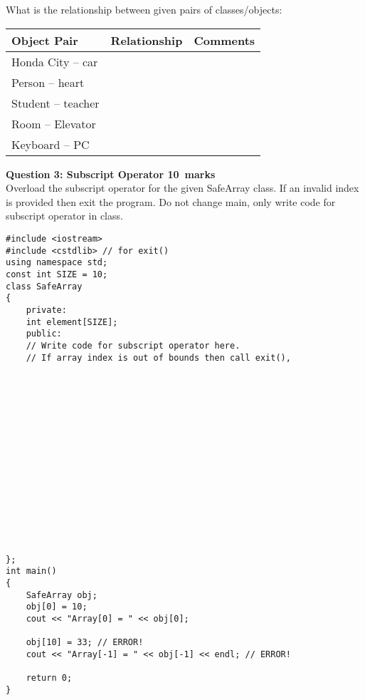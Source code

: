 \documentclass[12pt,a4paper]{article}
\def\Qthree{10}
\begin{document}
What is the relationship between given pairs of classes/objects:
\begin{table}[H]
\begin{center}
\vspace{0.3cm}
	{\normalsize \begin{tabular}{|l|c|p{8cm}|}
	\hline \hline
		\rule{0pt}{2.6ex} \textbf{Object Pair} & \textbf{Relationship} & \textbf{Comments}\\
		\hline
		Honda City -- car \rule{0pt}{2.6ex} & &\\
		Person -- heart \rule{0pt}{2.6ex} & &\\
		Student -- teacher \rule{0pt}{2.6ex} & &\\
		Room -- Elevator \rule{0pt}{2.6ex} & &\\
		Keyboard -- PC \rule{0pt}{2.6ex} & &\\
		\hline	\hline
	\end{tabular}}
\end{center}
\end{table}

\noindent\textbf{Question 3: Subscript Operator \hfill \Qthree~marks}\\
Overload the subscript operator for the given SafeArray class. If an invalid index is provided then exit the program. Do not change main, only write code for subscript operator in class.
\begin{lstlisting}
#include <iostream>
#include <cstdlib> // for exit()
using namespace std;
const int SIZE = 10;
class SafeArray
{
	private:
	int element[SIZE];
	public:
	// Write code for subscript operator here.
	// If array index is out of bounds then call exit(),
















};
int main()
{
	SafeArray obj;
	obj[0] = 10;
	cout << "Array[0] = " << obj[0];

	obj[10] = 33; // ERROR!
	cout << "Array[-1] = " << obj[-1] << endl; // ERROR!

	return 0;
}
\end{lstlisting}
\end{document}
